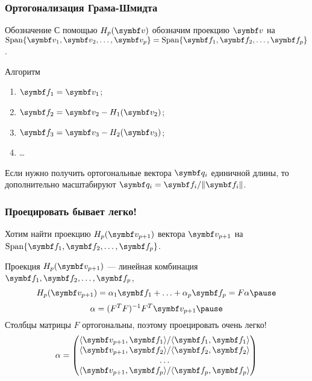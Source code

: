 \begin{frame}
    \frametitle{Ортогонализация Грама-Шмидта}
    
    \begin{block}{Обозначение}
        С помощью $H_p(\bv)$ обозначим проекцию $\bv$ на $\Span \{ \bv_1, \bv_2, \ldots, \bv_p \} = \Span \{ \bff_1, \bff_2, \ldots, \bff_p \}$. \pause
    \end{block}

    \begin{block}{Алгоритм}
        \begin{enumerate}
            \item $\bff_1 = \bv_1$; \pause
            \item $\bff_2 = \bv_2 - H_1(\bv_2)$; \pause
            \item $\bff_3 = \bv_3 - H_2(\bv_3)$; \pause
            \item \ldots
        \end{enumerate}        \pause
    \end{block}

    Если нужно получить ортогональные вектора $\bq_i$ единичной длины, то дополнительно масштабируют
    $\bq_i = \bff_i / \norm{\bff_i}$.
    
\end{frame}


\begin{frame}
    \frametitle{Проецировать бывает легко!}
    Хотим найти проекцию $H_p(\bv_{p+1})$ вектора  $\bv_{p+1}$ на $\Span\{ \bff_1, \bff_2, \ldots, \bff_p \}$. 

    Проекция $H_p(\bv_{p+1})$ — линейная комбинация $\bff_1, \bff_2, \ldots, \bff_p$,
    \[
        H_p(\bv_{p+1}) = \alpha_1 \bff_1 + \ldots + \alpha_p \bff_p = F \alpha    \pause
    \]
    \[
    \alpha = (F^TF)^{-1} F^T \bv_{p+1} \pause    
    \]
    Столбцы матрицы $F$ ортогональны, поэтому проецировать очень легко!
    \[
    \alpha = \begin{pmatrix}
        \langle \bv_{p+1}, \bff_1 \rangle / \langle \bff_1, \bff_1 \rangle \\
        \langle \bv_{p+1}, \bff_2 \rangle / \langle \bff_2, \bff_2 \rangle \\
        \ldots \\
\langle \bv_{p+1}, \bff_p \rangle / \langle \bff_p, \bff_p \rangle \\
    \end{pmatrix}    
    \]

\end{frame}


